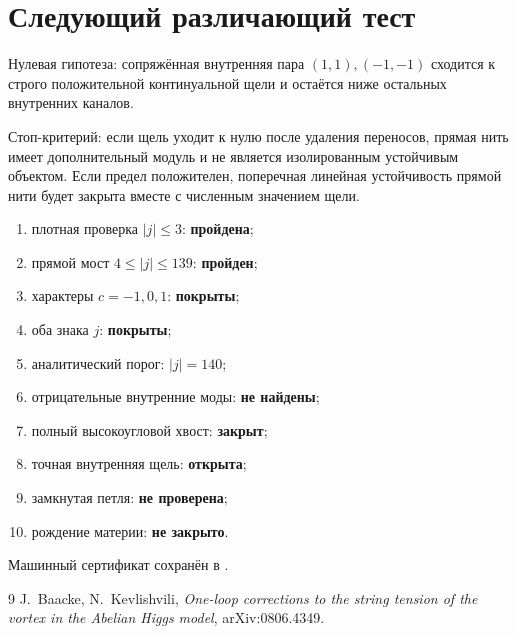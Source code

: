 \section{Следующий различающий тест}

Нулевая гипотеза: сопряжённая внутренняя пара $(1,1),(-1,-1)$ сходится к
строго положительной континуальной щели и остаётся ниже остальных внутренних
каналов.

Стоп-критерий: если щель уходит к нулю после удаления переносов, прямая нить
имеет дополнительный модуль и не является изолированным устойчивым объектом.
Если предел положителен, поперечная линейная устойчивость прямой нити будет
закрыта вместе с численным значением щели.

\begin{protocol}
\begin{enumerate}
 \item плотная проверка $|j|\le3$: \textbf{пройдена};
 \item прямой мост $4\le|j|\le139$: \textbf{пройден};
 \item характеры $c=-1,0,1$: \textbf{покрыты};
 \item оба знака $j$: \textbf{покрыты};
 \item аналитический порог: \textbf{$|j|=140$};
 \item отрицательные внутренние моды: \textbf{не найдены};
 \item полный высокоугловой хвост: \textbf{закрыт};
 \item точная внутренняя щель: \textbf{открыта};
 \item замкнутая петля: \textbf{не проверена};
 \item рождение материи: \textbf{не закрыто}.
\end{enumerate}
\end{protocol}

Машинный сертификат сохранён в
.

\begin{thebibliography}{9}
J.~Baacke, N.~Kevlishvili,
\emph{One-loop corrections to the string tension of the vortex in the
Abelian Higgs model}, arXiv:0806.4349.
\end{thebibliography}